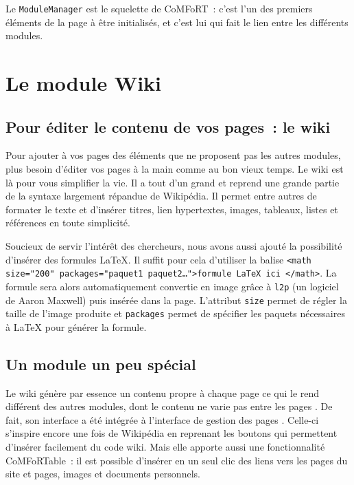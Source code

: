 \documentclass[final,11pt,a4paper,twoside,titlepage]{article}
\newcommand{\p}{\vspace{0.3em}}
\newcommand{\code}[1]{\texttt{#1}}
\begin{document}
{    Le \code{ModuleManager} est le squelette de CoMFoRT~: c'est l'un des
    premiers éléments de la page à être initialisés, et c'est lui qui fait le
    lien entre les différents modules.



  \section{Le module Wiki}
    \subsection{Pour éditer le contenu de vos pages~: le wiki}
      Pour ajouter à vos pages des éléments que ne proposent pas les autres
      modules, plus besoin d'éditer vos pages à la main comme au bon vieux
      temps. Le wiki est là pour vous simplifier la vie. Il a tout d'un grand et
      reprend une grande partie de la syntaxe largement répandue de Wikipédia.
      Il permet entre autres de
      formater le texte et d'insérer titres, lien hypertextes, images, tableaux,
      listes et références en toute simplicité.\p

      Soucieux de servir l'intérêt des chercheurs, nous avons aussi ajouté la
      possibilité d'insérer des formules \LaTeX{}. Il suffit pour cela
      d'utiliser la balise \code{<math size="200" packages="paquet1
      paquet2\ldots">formule LaTeX ici </math>}.
      La formule sera alors automatiquement convertie en image grâce à
      \code{l2p} (un logiciel de Aaron Maxwell) puis insérée dans la page.
      L'attribut
      \code{size} permet de régler la taille de l'image produite et
      \code{packages} permet de spécifier les paquets nécessaires à \LaTeX{}
      pour générer la formule.

    \subsection{Un module un peu spécial}
      Le wiki génère par essence un contenu propre à chaque page ce qui le rend
      différent des autres modules, dont le contenu ne varie pas entre les pages
      . De fait, son interface a été intégrée à l'interface de gestion des pages
      . Celle-ci s'inspire encore une fois de Wikipédia en reprenant les boutons
      qui permettent d'insérer facilement du code wiki. Mais elle apporte aussi
      une fonctionnalité CoMFoRTable~: il est possible d'insérer en un seul clic
      des liens vers les pages du site et pages, images et documents personnels.
      
}
\end{document}
